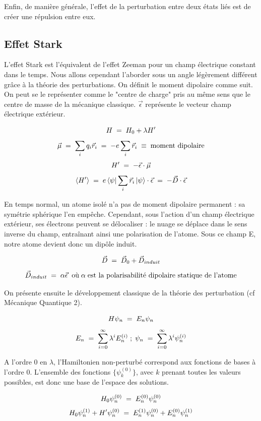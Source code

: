 Enfin, de manière générale, l'effet de la perturbation entre deux états liés est de créer une répulsion entre eux.




    \subsection{Effet Stark}




L'effet Stark est l'équivalent de l'effet Zeeman pour un champ électrique constant dans le temps. Nous allons cependant l'aborder sous un angle légèrement différent grâce à la théorie des perturbations. On définit le moment dipolaire comme suit. On peut se le représenter comme le "centre de charge" pris au même sens que le centre de masse de la mécanique classique. $\vec{\epsilon}$ représente le vecteur champ électrique extérieur.

\[
    H \; = \; H_0 + \lambda H'
\]
\[
    \vec{\mu} \; = \; \sum_i q_i \vec{r}_i \; = \; -e\sum_i \vec{r}_i\;\equiv\; \textrm{moment dipolaire}
\]
\[
    H' \; = \; -\vec{\epsilon}\cdot\vec{\mu}
\]
\[
    \expval{H'} \; = \; e\bra{\psi}\sum_i\vec{r}_i\ket{\psi}\cdot \vec{\epsilon} \; = \; -\vec{D}\cdot\vec{\epsilon}
\]

En temps normal, un atome isolé n'a pas de moment dipolaire permanent : sa symétrie sphérique l'en empêche. Cependant, sous l'action d'un champ électrique extérieur, ses électrons peuvent se délocaliser : le nuage se déplace dans le sens inverse du champ, entraînant ainsi une polarisation de l'atome. Sous ce champ E, notre atome devient donc un dipôle induit.

\[
    \vec{D} \; = \; \vec{D}_0 + \vec{D}_{induit}
\]
\[
    \vec{D}_{induit} \; = \; \alpha \vec{\epsilon} \;\; \text{où}\; \alpha \; \text{est la polarisabilité dipolaire statique de l'atome}
\]

On présente ensuite le développement classique de la théorie des perturbation (cf Mécanique Quantique 2).

\[
    H\psi_n \; = \; E_n \psi_n
\]
\[
    E_n \; = \; \sum_{i=0}^{\infty} \lambda^i E_n^{(i)}\; ; \; \psi_n \; = \; \sum_{i=0}^{\infty} \lambda^i \psi_n^{(i)}
\]

A l'ordre 0 en $\lambda$, l'Hamiltonien non-perturbé correspond aux fonctions de bases à l'ordre 0. L'ensemble des fonctions $\{\psi_k^{(0)}\}$, avec $k$ prenant toutes les valeurs possibles, est donc une base de l'espace des solutions.

\[
    H_0 \psi_n^{(0)} \; = \; E_n^{(0)} \psi_n^{(0)}
\]
\[
    H_0 \psi_n^{(1)} + H' \psi_n^{(0)} \; = \; E_n^{(1)} \psi_n^{(0)} + E_n^{(0)} \psi_n^{(1)}
\]

